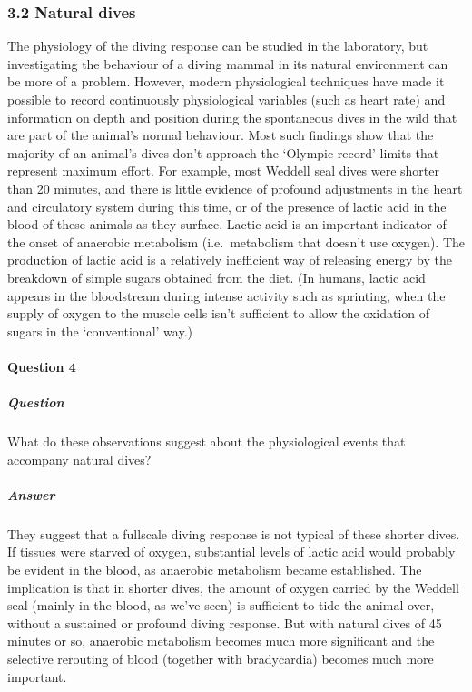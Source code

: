 \documentclass[letterpaper,10pt,english]{sphinxmanual}
\begin{document}
\subsubsection{3.2 Natural dives}
\label{\detokenize{content/session_00/Part_00_03:3.2-Natural-dives}}
The physiology of the diving response can be studied in the laboratory, but investigating the behaviour of a diving mammal in its natural environment can be more of a problem. However, modern physiological techniques have made it possible to record continuously physiological variables (such as heart rate) and information on depth and position during the spontaneous dives in the wild that are part of the animal’s normal behaviour. Most such findings show that the majority of an animal’s dives
don’t approach the ‘Olympic record’ limits that represent maximum effort. For example, most Weddell seal dives were shorter than 20 minutes, and there is little evidence of profound adjustments in the heart and circulatory system during this time, or of the presence of lactic acid in the blood of these animals as they surface. Lactic acid is an important indicator of the onset of anaerobic metabolism (i.e. metabolism that doesn’t use oxygen). The production of lactic acid is a relatively
inefficient way of releasing energy by the breakdown of simple sugars obtained from the diet. (In humans, lactic acid appears in the bloodstream during intense activity such as sprinting, when the supply of oxygen to the muscle cells isn’t sufficient to allow the oxidation of sugars in the ‘conventional’ way.)


\paragraph{Question 4}
\label{\detokenize{content/session_00/Part_00_03:Question-4}}


\subparagraph{Question}
\label{\detokenize{content/session_00/Part_00_03:id1}}
What do these observations suggest about the physiological events that accompany natural dives?


\subparagraph{Answer}
\label{\detokenize{content/session_00/Part_00_03:id2}}
They suggest that a full\sphinxhyphen{}scale diving response is not typical of these shorter dives. If tissues were starved of oxygen, substantial levels of lactic acid would probably be evident in the blood, as anaerobic metabolism became established. The implication is that in shorter dives, the amount of oxygen carried by the Weddell seal (mainly in the blood, as we’ve seen) is sufficient to tide the animal over, without a sustained or profound diving response. But with natural dives of 45 minutes or so,
anaerobic metabolism becomes much more significant and the selective re\sphinxhyphen{}routing of blood (together with bradycardia) becomes much more important.
\end{document}

